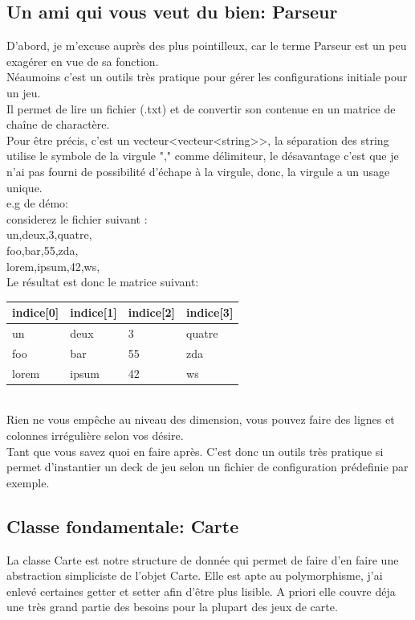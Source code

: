 \documentclass[12pt, letterpaper]{article}
\begin{document}
\subsection{Un ami qui vous veut du bien: Parseur}
D'abord, je m'excuse auprès des plus pointilleux, car le terme Parseur est un peu exagérer en vue de sa fonction.\\
Néaumoins c'est un outils très pratique pour gérer les configurations initiale pour un jeu.\\
Il permet de lire un fichier (.txt) et de convertir son contenue en un matrice de chaîne de charactère.\\
Pour être précis, c'est un vecteur<vecteur<string>>, la séparation des string utilise le symbole de la virgule "," comme délimiteur, 
le désavantage c'est que je n'ai pas fourni de possibilité d'échape à la virgule, donc,
la virgule a un usage unique.\\
e.g de démo: \\
considerez le fichier suivant :\\
un,deux,3,quatre,\\
foo,bar,55,zda,\\
lorem,ipsum,42,ws,\\

Le résultat est donc le matrice suivant:\\
\begin{tabular}{l|l|l|l}
  indice[0]  & indice[1] & indice[2] & indice[3]\\
  \hline  
  un & deux & 3 & quatre\\
  \hline
  foo & bar & 55 & zda\\
  \hline
  lorem & ipsum & 42 & ws\\
\end{tabular}
\\
Rien ne vous empêche au niveau des dimension, vous pouvez faire des lignes et colonnes irrégulière selon vos désire.\\
Tant que vous savez quoi en faire après.
C'est donc un outils très pratique si permet d'instantier un deck de jeu selon un fichier de configuration prédefinie par exemple.


\subsection{Classe fondamentale: Carte}
La classe Carte est notre structure de donnée qui permet de faire d'en faire une abstraction simpliciste de l'objet Carte.
Elle est apte au polymorphisme, j'ai enlevé certaines getter et setter afin d'être plus lisible. 
A priori elle couvre déja une très grand partie des besoins pour la plupart des jeux de carte.\\
\end{document}
